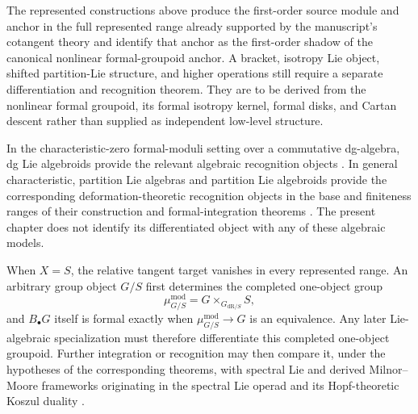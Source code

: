 The represented constructions above produce the first-order source module and
anchor in the full represented range already supported by the manuscript's cotangent
theory and identify
that anchor as the first-order shadow of the canonical nonlinear
formal-groupoid anchor.  A bracket, isotropy Lie object, shifted partition-Lie
structure, and higher operations still require a separate differentiation and
recognition theorem.  They are to be derived from the nonlinear formal
groupoid, its formal isotropy kernel, formal disks, and Cartan descent rather
than supplied as independent low-level structure.

In the characteristic-zero formal-moduli setting over a commutative
dg-algebra, dg Lie algebroids provide the relevant algebraic recognition
objects \cite{Nuiten2019}.  In general characteristic, partition Lie
algebras and partition Lie algebroids provide the corresponding
deformation-theoretic recognition objects in the base and finiteness ranges
of their construction and formal-integration theorems
\cite{BrantnerMathew2025,BrantnerCamposNuiten2025,
BrantnerMagidsonNuiten2025,Fu2024}.  The present chapter does not identify
its differentiated object with any of these algebraic models.

When $X=S$, the relative tangent target vanishes in every represented range.
An arbitrary group object $G/S$ first determines the completed one-object
group
\[
    \mu^{\mathrm{mod}}_{G/S}
    =
    G\times_{G_{\mathrm{dR}/S}}S,
\]
and $B_\bullet G$ itself is formal exactly when
$\mu^{\mathrm{mod}}_{G/S}\to G$ is an equivalence.  Any later
Lie-algebraic specialization must therefore differentiate this completed
one-object groupoid.  Further integration or recognition may then compare it,
under the hypotheses of the corresponding theorems, with spectral Lie and
derived Milnor--Moore frameworks originating in the spectral Lie operad and
its Hopf-theoretic Koszul duality \cite{Ching2005,Heine2024}.

